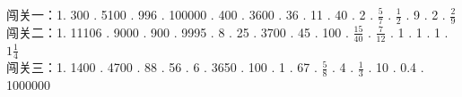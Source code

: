 \documentclass[a4paper,12pt]{ctexart}
\begin{document}
\noindent
闯关一：1. 300 . 5100 . 996 . 100000 . 400 . 3600 . 36 . 11 . 40 . 2 . $\frac57$ . $\frac12$ . 9 . 2 . $\frac29$ \\
闯关二：1. 11106 . 9000 . 900 . 9995 . 8 . 25 . 3700 . 45 . 100 . $\frac{15}{40}$ . $\frac{7}{12}$ . 1 . 1 . 1 . $1\frac14$ \\
闯关三：1. 1400 . 4700 . 88 . 56 . 6 . 3650 . 100 . 1 . 67 . $\frac58$ . 4 . $\frac13$ . 10 . 0.4 . 1000000
\end{document}
